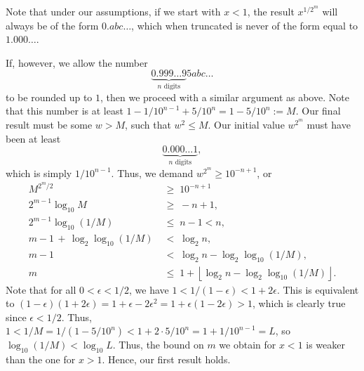 \documentclass[10pt]{article}
\begin{document}
        Note that under our assumptions, if we start with $x < 1$, the result $x^{1 /2^m}$ will always be of the form $0.abc\dots$,
        which when truncated is never of the form equal to $1.000\dots$.

        If, however, we allow the number
        \[
                \underbrace{0.999\dots 9}_{n\text{ digits}}5abc\dots
        \]
        to be rounded up to $1$, then we proceed with a similar argument as above. Note that this number is at least
        $1 - 1 / 10^{n - 1} + 5 / 10^n = 1 - 5 /10^{n}:= M$.
        Our final result must be some $w > M$, such that $w^2 \leq M$. Our initial value $w^{2^m}$ must have been at least
        \[
                \underbrace{0.000\dots 1}_{n\text{ digits}},
        \]
        which is simply $1 /10^{n - 1}$. Thus, we demand $w^{2^m} \geq 10^{-n + 1}$, or
        \begin{align*}
                M^{2^m / 2} \;&\geq\; 10^{-n + 1} \\
                2^{m-1}\log_{10}{M} \;&\geq\; -n + 1, \\
                2^{m-1}\log_{10}(1 /M) \;&\leq\; n - 1 < n, \\
                m - 1 \,+\, \log_2\log_{10}(1 /M) \;&<\; \log_2n, \\
                m - 1 \;&<\; \log_2n - \log_2\log_{10}(1 /M), \\
                m \;&\leq\; 1 + \left\lfloor \log_2{n} - \log_2\log_{10}(1 /M)\right\rfloor.
        \end{align*}
        Note that for all $0 < \epsilon < 1 /2$, we have $1 < 1 /(1 - \epsilon) < 1 + 2\epsilon$.
        This is equivalent to $(1 - \epsilon)(1 + 2\epsilon) = 1 + \epsilon - 2\epsilon^2 = 1 + \epsilon(1 - 2\epsilon)> 1$,
        which is clearly true since $\epsilon < 1 /2$.
        Thus, $1 < 1 /M = 1 /(1 - 5 /10^n) < 1 + 2\cdot 5 /10^n = 1 + 1 /10^{n-1} = L$, so $\log_{10}(1 /M) < \log_{10}{L}$. Thus, 
        the bound on $m$ we obtain for $x < 1$ is weaker than the one for $x > 1$. Hence, our first result holds.
\end{document}
